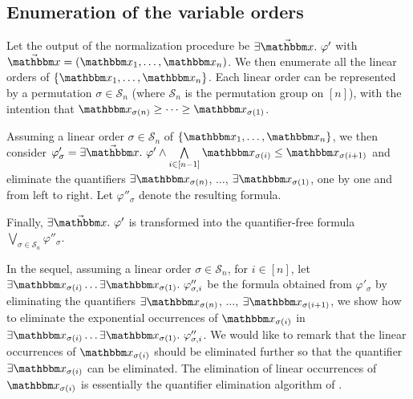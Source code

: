 \subsection{Enumeration of the variable orders} 

Let the output of the normalization procedure be $\exists \vec{\ivarx}.\ \varphi'$ with $\vec{\ivarx} = (\ivarx_1,\ldots, \ivarx_n)$. 
We then enumerate all the linear orders of $\{\ivarx_1,\ldots, \ivarx_n\}$. Each linear order can be represented by a permutation $\sigma \in \mathcal{S}_n$ (where $\mathcal{S}_n$ is the permutation group on $[n]$), with the intention that $\ivarx_{\sigma(n)} \ge \cdots \ge \ivarx_{\sigma(1)}$.

Assuming a linear order $\sigma \in \mathcal{S}_n$ of $\{\ivarx_1,\ldots, \ivarx_n\}$, we then consider $\varphi'_\sigma  = \exists \vec{\ivarx}.\ \varphi' \wedge \bigwedge \limits_{i \in [n-1]} \ivarx_{\sigma(i)} \le \ivarx_{\sigma(i+1)}$ and eliminate the quantifiers $\exists \ivarx_{\sigma(n)}$, $\ldots$, $\exists \ivarx_{\sigma(1)}$,  one by one and from left to right. Let $\varphi''_\sigma$ denote the resulting formula.

Finally, $\exists \vec{\ivarx}.\ \varphi'$ is transformed into the quantifier-free formula $\bigvee \limits_{\sigma \in \mathcal{S}_n} \varphi''_{\sigma}$. 

In the sequel, assuming a linear order $\sigma \in \mathcal{S}_n$, for $i \in [n]$, let $\exists \ivarx_{\sigma(i)} \ldots \exists \ivarx_{\sigma(1)}.\ \varphi''_{\sigma,i}$ be the formula obtained from $\varphi'_\sigma$ by eliminating the quantifiers $\exists \ivarx_{\sigma(n)}$, $\ldots$, $\exists \ivarx_{\sigma(i+1)}$, we show how to eliminate the exponential occurrences of $\ivarx_{\sigma(i)}$ in $\exists \ivarx_{\sigma(i)} \ldots \exists \ivarx_{\sigma(1)}.\ \varphi''_{\sigma,i}$. We would like to remark that the linear occurrences of $\ivarx_{\sigma(i)}$ should be eliminated further so that the quantifier $\exists \ivarx_{\sigma(i)}$ can be eliminated. The elimination of linear occurrences of $\ivarx_{\sigma(i)}$ is essentially the quantifier elimination algorithm of {\pa}.

